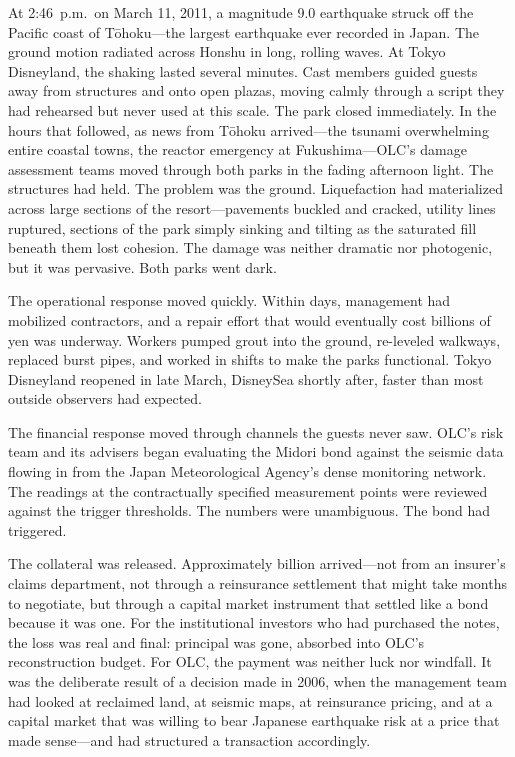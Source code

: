 \documentclass[11pt,openany]{book}
\begin{document}
\begin{corporateexample}
At 2:46~p.m.\ on March 11, 2011, a magnitude 9.0 earthquake struck off the
Pacific coast of T\=ohoku---the largest earthquake ever recorded in Japan. The
ground motion radiated across Honshu in long, rolling waves. At Tokyo
Disneyland, the shaking lasted several minutes. Cast members guided guests
away from structures and onto open plazas, moving calmly through a script they
had rehearsed but never used at this scale. The park closed immediately. In
the hours that followed, as news from T\=ohoku arrived---the tsunami
overwhelming entire coastal towns, the reactor emergency at Fukushima---OLC's
damage assessment teams moved through both parks in the fading afternoon
light. The structures had held. The problem was the ground. Liquefaction had
materialized across large sections of the resort---pavements buckled and
cracked, utility lines ruptured, sections of the park simply sinking and
tilting as the saturated fill beneath them lost cohesion. The damage was
neither dramatic nor photogenic, but it was pervasive. Both parks went dark.

The operational response moved quickly. Within days, management had mobilized
contractors, and a repair effort that would eventually cost billions of yen
was underway. Workers pumped grout into the ground, re-leveled walkways,
replaced burst pipes, and worked in shifts to make the parks functional. Tokyo
Disneyland reopened in late March, DisneySea shortly after, faster than most
outside observers had expected.

The financial response moved through channels the guests never saw. OLC's
risk team and its advisers began evaluating the Midori bond against the
seismic data flowing in from the Japan Meteorological Agency's dense
monitoring network. The readings at the contractually specified measurement
points were reviewed against the trigger thresholds. The numbers were
unambiguous. The bond had triggered.

The collateral was released. Approximately  billion arrived---not
from an insurer's claims department, not through a reinsurance settlement that
might take months to negotiate, but through a capital market instrument that
settled like a bond because it was one. For the institutional investors who
had purchased the notes, the loss was real and final: principal was gone,
absorbed into OLC's reconstruction budget. For OLC, the payment was neither
luck nor windfall. It was the deliberate result of a decision made in 2006,
when the management team had looked at reclaimed land, at seismic maps, at
reinsurance pricing, and at a capital market that was willing to bear Japanese
earthquake risk at a price that made sense---and had structured a transaction
accordingly.


\end{corporateexample}
\end{document}
